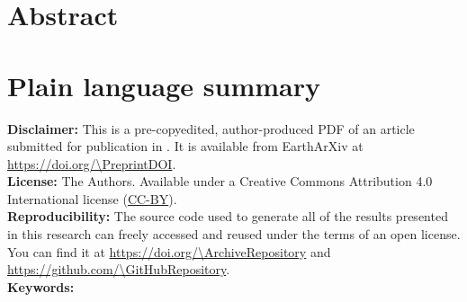 \documentclass[onecolumn,10pt]{article}
\begin{document}
\maketitle
\vspace{-1cm}
\section*{\large Abstract}
{\small }

\section*{\large Plain language summary}
{\small }

\begin{summarybox}
  \noindent
  \textbf{Disclaimer:}
  This is a pre-copyedited, author-produced PDF of an article
  submitted for publication in \textit{\Journal{}}.
  It is available from EarthArXiv at
  \url{https://doi.org/\PreprintDOI}.
  \\[0.25cm]
  \noindent
  \textbf{License:}
  \textcopyright{} \Year{} The Authors.
  Available under a Creative Commons Attribution 4.0 International license
  (\href{https://creativecommons.org/licenses/by/4.0/}{CC-BY}).
  \\[0.25cm]
  \noindent
  \textbf{Reproducibility:}
  The source code used to generate all of the results presented in this
  research can freely accessed and reused under the terms of an open license. You can find it at \url{https://doi.org/\ArchiveRepository} and \url{https://github.com/\GitHubRepository}.
  \\[0.25cm]
  \noindent
  \textbf{Keywords:} \Keywords{}
\end{summarybox}





\end{document}

